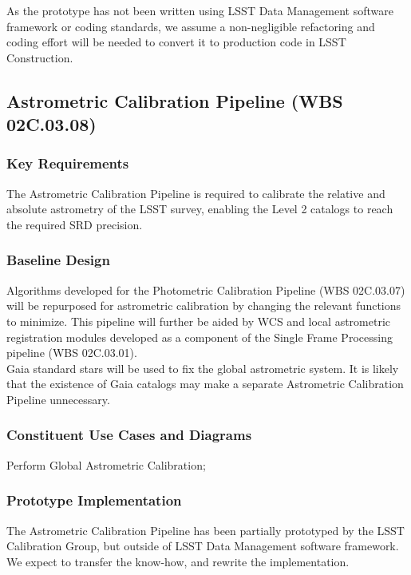 \documentclass[12pt]{article}
\newcommand{\wbsSFM}{WBS 02C.03.01}
\newcommand{\wbsPhotoCal}{WBS 02C.03.07}
\newcommand{\wbsAstroCal}{WBS 02C.03.08}
\begin{document}
As the prototype has not been written using LSST Data Management software framework or coding standards, we assume a non-negligible refactoring and coding effort will be needed to convert it to production code in LSST Construction.

\clearpage

\subsection{Astrometric Calibration Pipeline (\wbsAstroCal)}

\subsubsection{Key Requirements}

The Astrometric Calibration Pipeline is required to calibrate the relative and absolute astrometry of the LSST survey, enabling the Level 2 catalogs to reach the required SRD precision.

\subsubsection{Baseline Design}

Algorithms developed for the Photometric Calibration Pipeline (\wbsPhotoCal) will be repurposed for astrometric calibration by changing the relevant functions to minimize. This pipeline will further be aided by WCS and local astrometric registration modules developed as a component of the Single Frame Processing pipeline (\wbsSFM).
\\

Gaia standard stars will be used to fix the global astrometric system. It is likely that the existence of Gaia catalogs may make a separate Astrometric Calibration Pipeline unnecessary.

\subsubsection{Constituent Use Cases and Diagrams}

Perform Global Astrometric Calibration;

\subsubsection{Prototype Implementation}

The Astrometric Calibration Pipeline has been partially prototyped by the LSST Calibration Group, but outside of LSST Data Management software framework. We expect to transfer the know-how, and rewrite the implementation.
\end{document}
